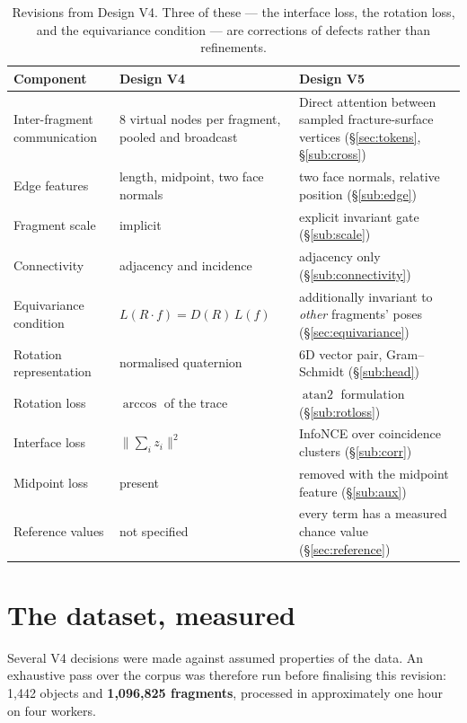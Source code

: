\documentclass[11pt,a4paper]{report}
\newcommand{\measured}[1]{\textbf{#1}}
\begin{document}
\begin{table}[h]
\centering
\small
\begin{tabular}{p{4.3cm}p{5.2cm}p{5.2cm}}
\toprule
\textbf{Component} & \textbf{Design V4} & \textbf{Design V5} \\
\midrule
Inter-fragment communication & 8 virtual nodes per fragment, pooled and broadcast & Direct attention between sampled fracture-surface vertices (\S\ref{sec:tokens}, \S\ref{sub:cross}) \\
Edge features & length, midpoint, two face normals & two face normals, relative position (\S\ref{sub:edge}) \\
Fragment scale & implicit & explicit invariant gate (\S\ref{sub:scale}) \\
Connectivity & adjacency and incidence & adjacency only (\S\ref{sub:connectivity}) \\
Equivariance condition & $L(R\cdot f) = D(R)\,L(f)$ & additionally invariant to \emph{other} fragments' poses (\S\ref{sec:equivariance}) \\
Rotation representation & normalised quaternion & 6D vector pair, Gram--Schmidt (\S\ref{sub:head}) \\
Rotation loss & $\arccos$ of the trace & $\operatorname{atan2}$ formulation (\S\ref{sub:rotloss}) \\
Interface loss & $\lVert\sum_i z_i\rVert^2$ & InfoNCE over coincidence clusters (\S\ref{sub:corr}) \\
Midpoint loss & present & removed with the midpoint feature (\S\ref{sub:aux}) \\
Reference values & not specified & every term has a measured chance value (\S\ref{sec:reference}) \\
\bottomrule
\end{tabular}
\caption{Revisions from Design V4. Three of these --- the interface loss, the
rotation loss, and the equivariance condition --- are corrections of defects
rather than refinements.}
\label{tab:revisions}
\end{table}

\section{The dataset, measured}
\label{sec:dataset}

Several V4 decisions were made against assumed properties of the data. An
exhaustive pass over the corpus was therefore run before finalising this
revision: 1{,}442 objects and \measured{1{,}096{,}825 fragments}, processed in
approximately one hour on four workers.
\end{document}
